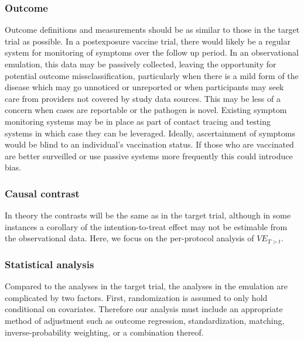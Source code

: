 \documentclass[11pt]{article}
\begin{document}
\subsubsection*{Outcome}
Outcome definitions and measurements should be as similar to those in the target trial as possible. In a postexposure vaccine trial, there would likely be a regular system for monitoring of symptoms over the follow up period. In an observational emulation, this data may be passively collected, leaving the opportunity for potential outcome missclassification, particularly when there is a mild form of the disease which may go unnoticed or unreported or when participants may seek care from providers not covered by study data sources. This may be less of a concern when cases are reportable or the pathogen is novel. Existing symptom monitoring systems may be in place as part of contact tracing and testing systems in which case they can be leveraged. Ideally, ascertainment of symptoms would be blind to an individual's vaccination status. If those who are vaccinated are better surveilled or use passive systems more frequently this could introduce bias. 

\subsubsection*{Causal contrast}
In theory the contrasts will be the same as in the target trial, although in some instances a corollary of the intention-to-treat effect may not be estimable from the observational data. Here, we focus on the per-protocol analysis of $VE_{T > t}$.

\subsubsection*{Statistical analysis}
Compared to the analyses in the target trial, the analyses in the emulation are complicated by two factors. First, randomization is assumed to only hold conditional on covariates. Therefore our analysis must include an appropriate method of adjustment such as outcome regression, standardization, matching, inverse-probability weighting, or a combination thereof. 
\end{document}
